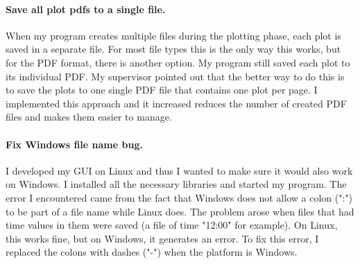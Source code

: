 \documentclass[../00_main.tex]{subfiles}
\begin{document}
\paragraph{Save all plot pdfs to a single file.} 

When my program creates multiple files during the plotting phase, each plot is 
saved in a separate file. For most file types this is the only way this works, 
but for the PDF format, there is another option. My program still saved each 
plot to its individual PDF. My supervisor pointed out that the better way to do 
this is to save the plots to one single PDF file that contains one plot per 
page. I implemented this approach and it increased reduces the number of 
created PDF files and makes them easier to manage.

\paragraph{Fix Windows file name bug.} 

I developed my GUI on Linux and thus I wanted to make sure it would also work 
on Windows. I installed all the necessary libraries and started my program. The 
error I encountered came from the fact that Windows does not allow a colon 
(":") to be part of a file name while Linux does. The problem arose when files 
that had time values in them were saved (a file of time "12:00" for example). 
On Linux, this works fine, but on Windows, it generates an error. To fix this 
error, I replaced the colons with dashes ("-") when the platform is Windows.
\end{document}
